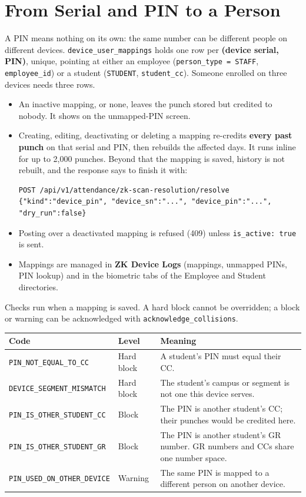 \documentclass[11pt]{article}
\begin{document}
\section{From Serial and PIN to a Person}\label{sec:mapping}
A PIN means nothing on its own: the same number can be different people on different devices.
\texttt{device\_user\_mappings} holds one row per \textbf{(device serial, PIN)}, unique, pointing at either an employee
(\texttt{person\_type = STAFF}, \texttt{employee\_id}) or a student (\texttt{STUDENT}, \texttt{student\_cc}). Someone
enrolled on three devices needs three rows.
\begin{itemize}[nosep]
  \item An inactive mapping, or none, leaves the punch stored but credited to nobody. It shows on the unmapped-PIN
        screen.
  \item Creating, editing, deactivating or deleting a mapping re-credits \textbf{every past punch} on that serial and
        PIN, then rebuilds the affected days. It runs inline for up to 2,000 punches. Beyond that the mapping is saved,
        history is not rebuilt, and the response says to finish it with:
\begin{lstlisting}
POST /api/v1/attendance/zk-scan-resolution/resolve
{"kind":"device_pin", "device_sn":"...", "device_pin":"...", "dry_run":false}
\end{lstlisting}
  \item Posting over a deactivated mapping is refused (409) unless \texttt{is\_active: true} is sent.
  \item Mappings are managed in \textbf{ZK Device Logs} (mappings, unmapped PINs, PIN lookup) and in the biometric tabs
        of the Employee and Student directories.
\end{itemize}
Checks run when a mapping is saved. A hard block cannot be overridden; a block or warning can be acknowledged with
\texttt{acknowledge\_collisions}.
\begin{center}
\begin{tabularx}{\textwidth}{@{}l l L@{}}
\toprule
\textbf{Code} & \textbf{Level} & \textbf{Meaning} \\
\midrule
\texttt{PIN\_NOT\_EQUAL\_TO\_CC} & Hard block & A student's PIN must equal their CC. \\
\texttt{DEVICE\_SEGMENT\_MISMATCH} & Hard block & The student's campus or segment is not one this device serves. \\
\texttt{PIN\_IS\_OTHER\_STUDENT\_CC} & Block & The PIN is another student's CC; their punches would be credited here. \\
\texttt{PIN\_IS\_OTHER\_STUDENT\_GR} & Block & The PIN is another student's GR number. GR numbers and CCs share one number space. \\
\texttt{PIN\_USED\_ON\_OTHER\_DEVICE} & Warning & The same PIN is mapped to a different person on another device. \\
\bottomrule
\end{tabularx}
\end{center}
\end{document}
